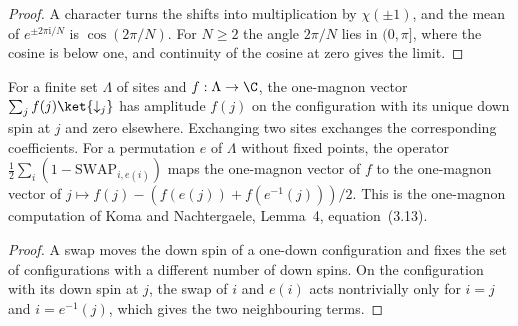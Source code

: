 \begin{proof}\leanok
    A character turns the shifts into multiplication by $\chi(\pm1)$, and the
    mean of $e^{\pm2\pi\mathrm i/N}$ is $\cos(2\pi/N)$. For $N\ge2$ the angle
    $2\pi/N$ lies in $(0,\pi]$, where the cosine is below one, and continuity
    of the cosine at zero gives the limit.
\end{proof}

\begin{lemma}
    \label{lem:one_magnon_exchange}
    \leanok
    For a finite set $\Lambda$ of sites and $f:\Lambda\to\C$, the one-magnon
    vector $\sum_jf(j)\ket{\downarrow_j}$ has amplitude $f(j)$ on the
    configuration with its unique down spin at $j$ and zero elsewhere.
    Exchanging two sites exchanges the corresponding coefficients. For a
    permutation $e$ of $\Lambda$ without fixed points, the operator
    $\frac12\sum_i(1-\mathrm{SWAP}_{i,e(i)})$ maps the one-magnon vector of $f$
    to the one-magnon vector of $j\mapsto f(j)-(f(e(j))+f(e^{-1}(j)))/2$.
    This is the one-magnon computation of Koma and Nachtergaele, Lemma~4,
    equation~(3.13).
\end{lemma}

\begin{proof}\leanok
    A swap moves the down spin of a one-down configuration and fixes the set
    of configurations with a different number of down spins. On the
    configuration with its down spin at $j$, the swap of $i$ and $e(i)$ acts
    nontrivially only for $i=j$ and $i=e^{-1}(j)$, which gives the two
    neighbouring terms.
\end{proof}
